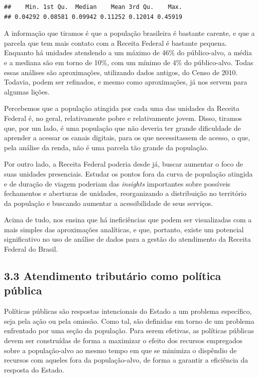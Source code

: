 \documentclass[]{article}
\begin{document}
\begin{verbatim}
##    Min. 1st Qu.  Median    Mean 3rd Qu.    Max. 
## 0.04292 0.08581 0.09942 0.11252 0.12014 0.45919
\end{verbatim}

A informação que tiramos é que a população brasileira é bastante
carente, e que a parcela que tem mais contato com a Receita Federal é
bastante pequena. Enquanto há unidades atendendo a um máximo de 46\% do
público-alvo, a média e a mediana são em torno de 10\%, com um mínimo de
4\% do público-alvo. Todas essas análises são aproximações, utilizando
dados antigos, do Censo de 2010. Todavia, podem ser refinados, e mesmo
como aproximações, já nos servem para algumas lições.

Percebemos que a população atingida por cada uma das unidades da Receita
Federal é, no geral, relativamente pobre e relativamente jovem. Disso,
tiramos que, por um lado, é uma população que não deveria ter grande
dificuldade de aprender a acessar os canais digitais, para os que
necessitassem de acesso, o que, pela análise da renda, não é uma parcela
tão grande da população.

Por outro lado, a Receita Federal poderia desde já, buscar aumentar o
foco de suas unidades presenciais. Estudar os pontos fora da curva de
população atingida e de duração de viagem poderiam das \emph{insights}
importantes sobre possíveis fechamentos e aberturas de unidades,
reorganizando a distribuição no território da população e buscando
aumentar a acessibilidade de seus serviços.

Acima de tudo, nos ensina que há ineficiências que podem ser
visualizadas com a mais simples das aproximações analíticas, e que,
portanto, existe um potencial significativo no uso de análise de dados
para a gestão do atendimento da Receita Federal do Brasil.

\hypertarget{atendimento-tributario-como-politica-publica}{%
\subsection{3.3 Atendimento tributário como política
pública}\label{atendimento-tributario-como-politica-publica}}

Políticas públicas são respostas intencionais do Estado a um problema
específico, seja pela ação ou pela omissão. Como tal, são definidas em
torno de um problema enfrentado por uma seção da população. Para serem
efetivas, as políticas públicas devem ser construídas de forma a
maximizar o efeito dos recursos empregados sobre a população-alvo ao
mesmo tempo em que se minimiza o dispêndio de recursos com aqueles fora
da população-alvo, de forma a garantir a eficiência da resposta do
Estado.
\end{document}
